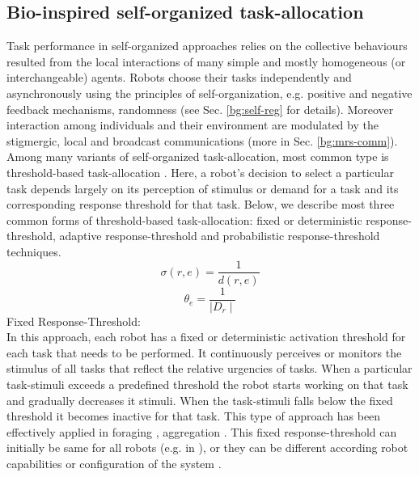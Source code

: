\subsection{Bio-inspired self-organized task-allocation}
Task performance in self-organized approaches relies on the collective behaviours resulted from the local interactions of many simple and mostly homogeneous (or interchangeable) agents. Robots choose their tasks independently and asynchronously using the principles of self-organization, e.g. positive and negative feedback mechanisms, randomness (see Sec. \ref{bg:self-reg} for details). Moreover interaction among individuals and their environment are modulated by the stigmergic, local and broadcast communications (more in Sec. \ref{bg:mrs-comm}).  Among many variants of self-organized task-allocation, most common type is threshold-based task-allocation \cite{Bonabeau+1999}. Here, a robot's decision to select a particular task depends largely on its perception of stimulus or demand for a task and its corresponding response threshold for that task. Below, we describe most three common forms of threshold-based task-allocation: fixed or deterministic response-threshold, adaptive response-threshold and probabilistic response-threshold techniques.\\ 
\begin{equation}
\label{eqn:fixed-response-th1}
\sigma (r,e) = \frac{1}{d(r,e)}
\end{equation}
\begin{equation}
\label{eqn:fixed-response-th2}
\theta_{e} = \frac{1}{\mid D_{r} \mid}
\end{equation}
Fixed Response-Threshold:\\
In this approach, each robot has a fixed or deterministic activation threshold for each task that needs to be performed. It continuously perceives or monitors the stimulus of all tasks that reflect the relative urgencies of tasks. When a particular task-stimuli exceeds a predefined  threshold the robot starts working on that task and gradually decreases it stimuli. When the task-stimuli falls below the fixed threshold it becomes inactive for that task. This type of approach has been effectively applied in foraging , aggregation . This fixed response-threshold can initially be same for all robots (e.g. in \cite{Jones+200}), or they can be different according robot capabilities or configuration of the system .\\ 
